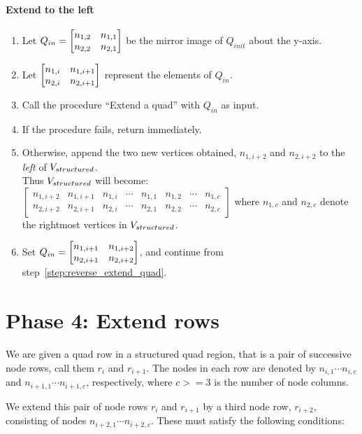 \paragraph{Extend to the left}
\begin{enumerate}[resume]

\item \label{step:init_reverse} Let $Q_{in} = \begin{bmatrix} n_{1,2} & n_{1,1} \\ n_{2,2} & n_{2,1} \end{bmatrix}$ be the mirror image of $Q_{init}$ about the y-axis.



\item \label{step:reverse_extend_quad} Let $\begin{bmatrix} n_{1,i} & n_{1,i+1} \\ n_{2,i} & n_{2,i+1} \end{bmatrix}$ represent the elements of $Q_{in}$.
\item Call the procedure ``Extend a quad'' with $Q_{in}$ as input.
\item If the procedure fails, return immediately.
\item Otherwise, append the two new vertices obtained, $n_{1,i+2}$ and $n_{2,i+2}$ to the \emph{left} of $V_{structured}$. \\
Thus $V_{structured}$ will become:
	$\begin{bmatrix}
	n_{1,i+2} & n_{1,i+1} & n_{1,i} & \cdots & n_{1,1} & n_{1,2} & \cdots  & n_{1,c} \\
	n_{2,i+2} & n_{2,i+1} & n_{2,i} & \cdots & n_{2,1} & n_{2,2} & \cdots  & n_{2,c}
	\end{bmatrix}$
where $n_{1,c}$ and $n_{2,c}$ denote the rightmost vertices in $V_{structured}$.

\item Set $Q_{in} = \begin{bmatrix} n_{1,i+1} & n_{1,i+2} \\ n_{2,i+1} & n_{2,i+2} \end{bmatrix}$, and continue from step~\ref{step:reverse_extend_quad}.
\end{enumerate}






\section{Phase 4: Extend rows}
We are given a quad row in a structured quad region, that is a pair of successive node rows, call them $r_i$ and $r_{i+1}$.
The nodes in each row are denoted by $n_{i,1} \cdots n_{i,c}$ and $n_{i+1,1} \cdots n_{i+1,c}$, respectively, where $c >= 3$ is the number of node columns.

We extend this pair of node rows $r_i$ and $r_{i+1}$ by a third node row, $r_{i+2}$, consisting of nodes $n_{i+2,1} \cdots n_{i+2,c}$. These must satisfy the following conditions:

